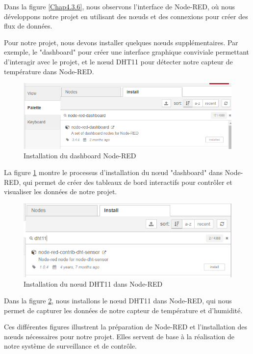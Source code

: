 Dans la figure \ref{Chap4.3.6}, nous observons l'interface de Node-RED, où nous développons notre projet en utilisant des nœuds et des connexions pour créer des flux de données.

Pour notre projet, nous devons installer quelques nœuds supplémentaires. Par exemple, le "dashboard" pour créer une interface graphique conviviale permettant d'interagir avec le projet, et le nœud DHT11 pour détecter notre capteur de température dans Node-RED.

\begin{figure}[H]
\centering
\includegraphics[width=15cm]{Images/Node-Red-Dashboard-Installed.png}
\caption{Installation du dashboard Node-RED}
\label{Chap4.3.7}
\end{figure}

La figure \ref{Chap4.3.7} montre le processus d'installation du nœud "dashboard" dans Node-RED, qui permet de créer des tableaux de bord interactifs pour contrôler et visualiser les données de notre projet.

\begin{figure}[H]
\centering
\includegraphics[width=15cm]{Images/DHT11-Node-Red-Install.png}
\caption{Installation du nœud DHT11 dans Node-RED}
\label{Chap4.3.8}
\end{figure}

Dans la figure \ref{Chap4.3.8}, nous installons le nœud DHT11 dans Node-RED, qui nous permet de capturer les données de notre capteur de température et d'humidité.

Ces différentes figures illustrent la préparation de Node-RED et l'installation des nœuds nécessaires pour notre projet. Elles servent de base à la réalisation de notre système de surveillance et de contrôle.


